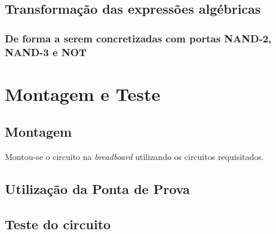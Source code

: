 \documentclass[a4paper,12pt]{article}
\begin{document}
\subsection{Transformação das expressões algébricas}

\subsubsection{De forma a serem concretizadas com portas NAND-2, NAND-3 e NOT}


\section{Montagem e Teste}
\subsection{Montagem}
Montou-se o circuito na {\it breadboard} utilizando os circuitos requisitados.
\subsection{Utilização da Ponta de Prova}
\pagebreak
\subsection{Teste do circuito}
\end{document}
